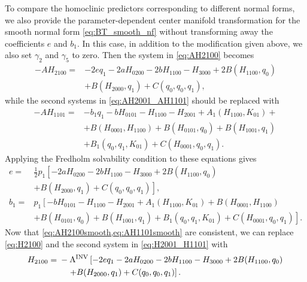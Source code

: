 To compare the homoclinic predictors corresponding to different normal forms, we also
provide the parameter-dependent center manifold transformation for the smooth
normal form \cref{eq:BT_smooth_nf} without transforming away the coefficients
$e$ and $b_1$. In this case, in addition to the modification given above, we also set
$\gamma_2$ and $\gamma_5$ to zero. Then the system in \cref{eq:AH2100} becomes
\begin{equation}
\label{eq:AH2100smooth}
\begin{aligned}
-A H_{2100} ={}& - 2 e q_1 -2 a H_{0200}-2 b H_{1100}-H_{3000} + 2 B(H_{1100},q_0) \\
				& + B(H_{2000},q_1) + C(q_0,q_0,q_1),
\end{aligned}
\end{equation}
while the second systems in \cref{eq:AH2001_AH1101} should be replaced with
\begin{equation}
\label{eq:AH1101smooth}
\begin{aligned}
-AH_{1101} ={}& -b_1 q_1 -b H_{0101} - H_{1100} - H_{2001} + A_1(H_{1100},K_{01}) + \\
              &+ B(H_{0001},H_{1100}) + B(H_{0101},q_0) + B(H_{1001},q_1) \\
              &+ B_1(q_0,q_1,K_{01}) + C(H_{0001},q_0,q_1).
\end{aligned}
\end{equation}
Applying the Fredholm solvability condition to these equations gives
\begin{equation*}
\begin{aligned}
e ={}& \frac{1}{2} p_1 \left[ -2 a H_{0200}-2 b H_{1100}-H_{3000} + 2 B(H_{1100},q_0) \right.  \\
     & \left. + B(H_{2000},q_1) + C(q_0,q_0,q_1) \right], \\ 
b_1 ={}& p_1 \left[ -b H_{0101} - H_{1100} - H_{2001} + A_1(H_{1100},K_{01}) + B(H_{0001},H_{1100})  \right. \\
      & \left. + B(H_{0101},q_0) + B(H_{1001},q_1) + B_1(q_0,q_1,K_{01}) + C(H_{0001},q_0,q_1) \right].
\end{aligned}
\end{equation*}
Now that \cref{eq:AH2100smooth,eq:AH1101smooth} are consistent, we can replace
\cref{eq:H2100} and the second system in \cref{eq:H2001_H1101} with
\begin{align*}
	H_{2100} ={} & -\operatorname{A^{\text{INV}}} \left[ -2e q_1 - 2 a H_{0200}-2 b H_{1100}-H_{3000} + 2 B(H_{1100},q_0) \right. \\
	             & \left. \quad + B(H_{2000},q_1) + C(q_0,q_0,q_1) \right]. \nonumber
\end{align*}
